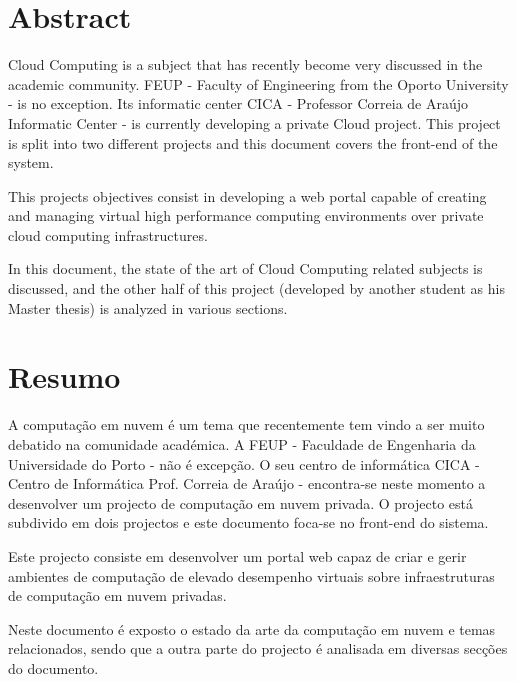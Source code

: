\chapter*{Abstract}

Cloud Computing is a subject that has recently become very discussed in the academic community. FEUP - Faculty of Engineering from the Oporto University - is no exception. Its informatic center CICA - Professor Correia de Araújo Informatic Center - is currently developing a private Cloud project. This project is split into two different projects and this document covers the front-end of the system.

This projects objectives consist in developing a web portal capable of creating and managing virtual high performance computing environments over private cloud computing infrastructures.

In this document, the state of the art of Cloud Computing related subjects is discussed, and the other half of this project (developed by another student as his Master thesis) is analyzed in various sections.

\chapter*{Resumo}

A computação em nuvem é um tema que recentemente tem vindo a ser muito debatido na comunidade académica. A FEUP - Faculdade de Engenharia da Universidade do Porto - não é excepção. O seu centro de informática CICA - Centro de Informática Prof. Correia de Araújo - encontra-se neste momento a desenvolver um projecto de computação em nuvem privada. O projecto está subdivido em dois projectos e este documento foca-se no front-end do sistema.

Este projecto consiste em desenvolver um portal web capaz de criar e gerir ambientes de computação de elevado desempenho virtuais sobre infraestruturas de computação em nuvem privadas.

Neste documento é exposto o estado da arte da computação em nuvem e temas relacionados, sendo que a outra parte do projecto é analisada em diversas secções do documento.

